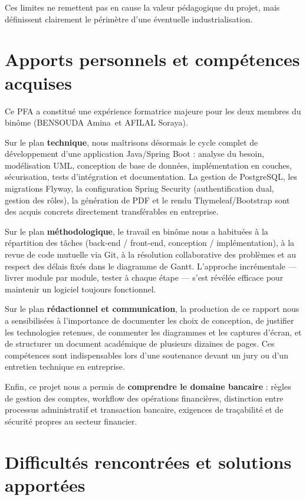 \documentclass[11pt,a4paper,oneside]{report}
\newcommand{\etudianteun}{BENSOUDA Amina}
\newcommand{\etudiantedeux}{AFILAL Soraya}
\begin{document}
Ces limites ne remettent pas en cause la valeur pédagogique du projet, mais définissent clairement le périmètre d'une éventuelle industrialisation.

\section*{Apports personnels et compétences acquises}

Ce PFA a constitué une expérience formatrice majeure pour les deux membres du binôme (\etudianteun\ et \etudiantedeux).

Sur le plan \textbf{technique}, nous maîtrisons désormais le cycle complet de développement d'une application Java/Spring Boot : analyse du besoin, modélisation UML, conception de base de données, implémentation en couches, sécurisation, tests d'intégration et documentation. La gestion de PostgreSQL, les migrations Flyway, la configuration Spring Security (authentification dual, gestion des rôles), la génération de PDF et le rendu Thymeleaf/Bootstrap sont des acquis concrets directement transférables en entreprise.

Sur le plan \textbf{méthodologique}, le travail en binôme nous a habituées à la répartition des tâches (back-end / front-end, conception / implémentation), à la revue de code mutuelle via Git, à la résolution collaborative des problèmes et au respect des délais fixés dans le diagramme de Gantt. L'approche incrémentale --- livrer module par module, tester à chaque étape --- s'est révélée efficace pour maintenir un logiciel toujours fonctionnel.

Sur le plan \textbf{rédactionnel et communication}, la production de ce rapport nous a sensibilisées à l'importance de documenter les choix de conception, de justifier les technologies retenues, de commenter les diagrammes et les captures d'écran, et de structurer un document académique de plusieurs dizaines de pages. Ces compétences sont indispensables lors d'une soutenance devant un jury ou d'un entretien technique en entreprise.

Enfin, ce projet nous a permis de \textbf{comprendre le domaine bancaire} : règles de gestion des comptes, workflow des opérations financières, distinction entre processus administratif et transaction bancaire, exigences de traçabilité et de sécurité propres au secteur financier.

\section*{Difficultés rencontrées et solutions apportées}
\end{document}

